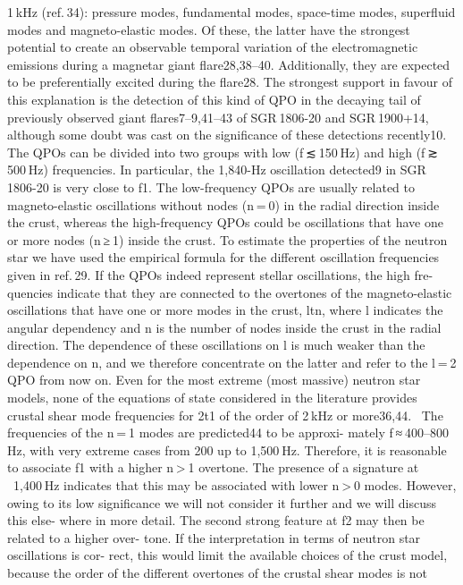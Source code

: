 1 kHz (ref. 34): pressure modes, fundamental modes, space-time
modes, superfluid modes and magneto-elastic modes. Of these, the
latter have the strongest potential to create an observable temporal
variation of the electromagnetic emissions during a magnetar giant
flare28,38–40. Additionally, they are expected to be preferentially excited
during the flare28. The strongest support in favour of this explanation
is the detection of this kind of QPO in the decaying tail of previously
observed giant flares7–9,41–43 of SGR 1806-20 and SGR 1900+14, although
some doubt was cast on the significance of these detections recently10.
The QPOs can be divided into two groups with low (f ≲ 150 Hz) and
high (f ≳ 500 Hz) frequencies. In particular, the 1,840-Hz oscillation
detected9 in SGR 1806-20 is very close to f1. The low-frequency QPOs are
usually related to magneto-elastic oscillations without nodes (n = 0) in
the radial direction inside the crust, whereas the high-frequency QPOs
could be oscillations that have one or more nodes (n ≥ 1) inside the crust.
To estimate the properties of the neutron star we have used the
empirical formula for the different oscillation frequencies given in
ref. 29. If the QPOs indeed represent stellar oscillations, the high fre-
quencies indicate that they are connected to the overtones of the
magneto-elastic oscillations that have one or more modes in the crust,
ltn, where l indicates the angular dependency and n is the number of
nodes inside the crust in the radial direction. The dependence of these
oscillations on l is much weaker than the dependence on n, and we
therefore concentrate on the latter and refer to the l = 2 QPO from now
on. Even for the most extreme (most massive) neutron star models,
none of the equations of state considered in the literature provides
crustal shear mode frequencies for 2t1 of the order of 2 kHz or more36,44.
 The frequencies of the n = 1 modes are predicted44 to be approxi-
mately f ≈ 400–800 Hz, with very extreme cases from 200 up to
1,500 Hz. Therefore, it is reasonable to associate f1 with a higher n > 1
overtone. The presence of a signature at ~1,400 Hz indicates that this
may be associated with lower n > 0 modes. However, owing to its low
significance we will not consider it further and we will discuss this else-
where in more detail.
The second strong feature at f2 may then be related to a higher over-
tone. If the interpretation in terms of neutron star oscillations is cor-
rect, this would limit the available choices of the crust model, because
the order of the different overtones of the crustal shear modes is not
